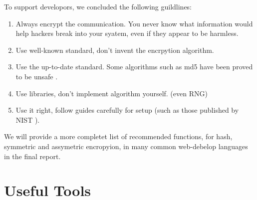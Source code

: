 \documentclass[conference]{IEEEtran}
\begin{document}
To support developors, we concluded the following guildlines:
\begin{enumerate}[label=\textbf{\arabic*.}]
    \item
Always encrypt the communication. You never know what information would help hackers
break into your syatem, even if they appear to be harmless.
    \item
Use well-known standard, don't invent the encrpytion algorithm.
    \item
Use the up-to-date standard.
Some algorithms such as md5 have been proved to be unsafe \cite{md5_break}.
    \item
Use libraries, don't implement algorithm yourself.
(even  RNG)
    \item
Use it right,
follow guides carefully for setup (such as those published by NIST \cite{NIST}).
\end{enumerate}

We will provide a more completet list of recommended functions,
for hash, symmetric and assymetric encropyion,
in many common web-debelop languages
in the final report.

%
%
%
%


%   
\section{Useful Tools}
\end{document}
